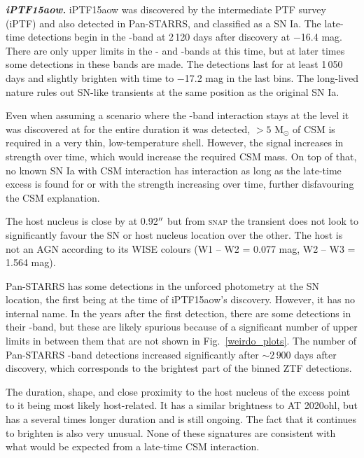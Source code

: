 \documentclass[a4paper,oneside,12pt, class=Latex/Classes/PhDthesisPSnPDF, crop=false]{standalone}
\begin{document}
\textit{\textbf{iPTF15aow.}}
iPTF15aow was discovered by the intermediate PTF survey (iPTF) and also detected in Pan-STARRS, and classified as a SN Ia. The late-time detections begin in the \ztfr-band at 2\,120 days after discovery at $-$16.4 mag. There are only upper limits in the \ztfg- and \ztfi-bands at this time, but at later times some detections in these bands are made. The detections last for at least 1\,050 days and slightly brighten with time to $-$17.2 mag in the last bins. The long-lived nature rules out SN-like transients at the same position as the original SN Ia.

Even when assuming a scenario where the \ztfr-band interaction stays at the level it was discovered at for the entire duration it was detected, $> 5$ M$_\odot$ of CSM is required in a very thin, low-temperature shell. However, the signal increases in strength over time, which would increase the required CSM mass. On top of that, no known SN Ia with CSM interaction has interaction as long as the late-time excess is found for or with the strength increasing over time, further disfavouring the CSM explanation.

The host nucleus is close by at 0.92$^{\prime\prime}$ but from \textsc{snap} the transient does not look to significantly favour the SN or host nucleus location over the other. The host is not an AGN according to its WISE colours (W1 -- W2 = 0.077 mag, W2 -- W3 = 1.564 mag).

Pan-STARRS has some detections in the unforced photometry at the SN location, the first being at the time of iPTF15aow's discovery. However, it has no internal name. In the years after the first detection, there are some detections in their \ztfi-band, but these are likely spurious because of a significant number of upper limits in between them that are not shown in Fig.~\ref{weirdo_plots}. The number of Pan-STARRS \ztfi-band detections increased significantly after $\sim2\,900$ days after discovery, which corresponds to the brightest part of the binned ZTF detections.

The duration, shape, and close proximity to the host nucleus of the excess point to it being most likely host-related. It has a similar brightness to AT 2020ohl, but has a several times longer duration and is still ongoing. The fact that it continues to brighten is also very unusual. None of these signatures are consistent with what would be expected from a late-time CSM interaction.
\end{document}
